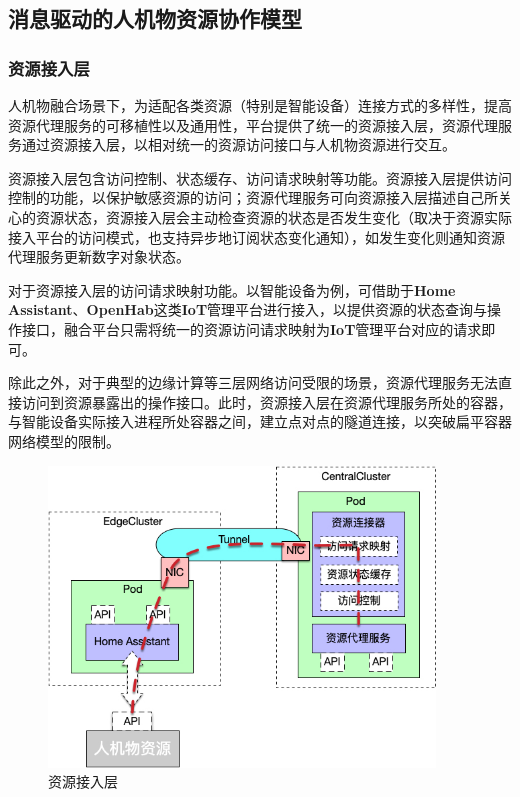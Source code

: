 \documentclass[a4paper, 12pt]{article}
\theoremstyle{definition}
\begin{document}
\subsection{消息驱动的人机物资源协作模型}

\subsubsection{资源接入层}

人机物融合场景下，为适配各类资源（特别是智能设备）连接方式的多样性，提高资源代理服务的可移植性以及通用性，平台提供了统一的资源接入层，资源代理服务通过资源接入层，以相对统一的资源访问接口与人机物资源进行交互。

资源接入层包含访问控制、状态缓存、访问请求映射等功能。资源接入层提供访问控制的功能，以保护敏感资源的访问；资源代理服务可向资源接入层描述自己所关心的资源状态，资源接入层会主动检查资源的状态是否发生变化（取决于资源实际接入平台的访问模式，也支持异步地订阅状态变化通知），如发生变化则通知资源代理服务更新数字对象状态。

对于资源接入层的访问请求映射功能。以智能设备为例，可借助于\textbf{Home Assistant}、\textbf{OpenHab}这类\textbf{IoT}管理平台进行接入，以提供资源的状态查询与操作接口，融合平台只需将统一的资源访问请求映射为\textbf{IoT}管理平台对应的请求即可。

除此之外，对于典型的边缘计算等三层网络访问受限的场景，资源代理服务无法直接访问到资源暴露出的操作接口。此时，资源接入层在资源代理服务所处的容器，与智能设备实际接入进程所处容器之间，建立点对点的隧道连接，以突破扁平容器网络模型的限制。

\begin{figure}[ht]
 \centering
 \includegraphics[height=8cm]{images/connector.jpg}
 \caption{资源接入层}
 \label{fig:singleblock}
\end{figure}
\end{document}
